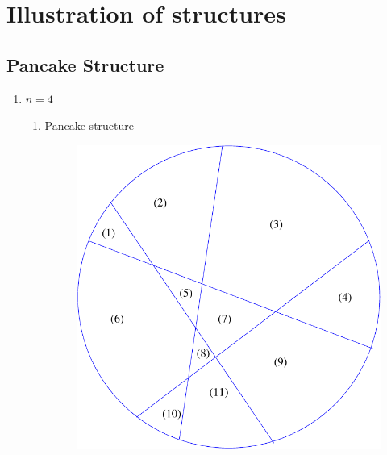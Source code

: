 \documentclass[a4paper,10pt]{article}
\begin{document}
\newpage


\section{Illustration of structures}

\subsection{Pancake Structure}
\begin{enumerate}
  \item $n = 4$\\
  	\begin{enumerate}
    	\item Pancake structure\\
    	\begin{figure}[h!]
			\includegraphics[scale=0.3]{graphics/pancakecut11}
			\captionsetup{labelformat=empty}
			\caption{}
			\label{fig:pancakecut11}
		\end{figure}
  \end{enumerate}
  

\end{enumerate}
\end{document}
